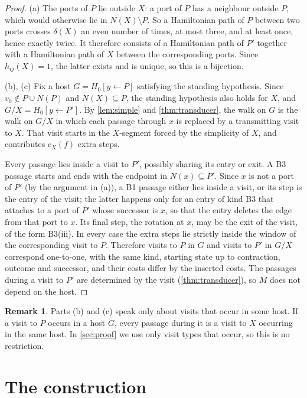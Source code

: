\documentclass[11pt]{article}
\theoremstyle{definition}
\newtheorem{remark}[theorem]{Remark}
\begin{document}
\begin{proof}
(a) The ports of $P$ lie outside $X$: a port of $P$ has a neighbour outside $P$, which would
otherwise lie in $N(X) \setminus P$. So a Hamiltonian path of $P$ between two ports crosses
$\delta(X)$ an even number of times, at most three, and at least once, hence exactly twice. It
therefore consists of a Hamiltonian path of $P'$ together with a Hamiltonian path of $X$ between
the corresponding ports. Since $h_{ij}(X) = 1$, the latter exists and is unique, so this is a
bijection.

(b), (c) Fix a host $G = H_0[y \leftarrow P]$ satisfying the standing hypothesis. Since
$v_0 \notin P \cup N(P)$ and $N(X) \subseteq P$, the standing hypothesis also holds for $X$, and
$G/X = H_0[y \leftarrow P']$. By \cref{lem:simple} and \cref{thm:transducer}, the walk on $G$ is
the walk on $G/X$ in which each passage through $x$ is replaced by a transmitting visit to $X$.
That visit starts in the $X$-segment forced by the simplicity of $X$, and contributes $c_X(f)$
extra steps.

Every passage lies inside a visit to $P'$, possibly sharing its entry or exit. A B3 passage starts
and ends with the endpoint in $N(x) \subseteq P'$. Since $x$ is not a port of $P'$ (by the
argument in (a)), a B1 passage either lies inside a visit, or its step is the entry of the visit;
the latter happens only for an entry of kind B3 that attaches to a port of $P'$ whose successor is
$x$, so that the entry deletes the edge from that port to $x$. Its final step, the rotation at
$x$, may be the exit of the visit, of the form B3(iii). In every case the extra steps lie
strictly inside the window of the corresponding visit to $P$. Therefore visits to $P$ in $G$ and
visits to $P'$ in $G/X$ correspond one-to-one, with the same kind, starting state up to
contraction, outcome and successor, and their costs differ by the inserted costs. The passages
during a visit to $P'$ are determined by the visit (\cref{thm:transducer}), so $M$ does not depend
on the host.
\end{proof}

\begin{remark}
Parts (b) and (c) speak only about visits that occur in some host. If a visit to $P$ occurs in a
host $G$, every passage during it is a visit to $X$ occurring in the same host. In
\cref{sec:proof} we use only visit types that occur, so this is no restriction.
\end{remark}

\section{The construction}\label{sec:construction}
\end{document}
